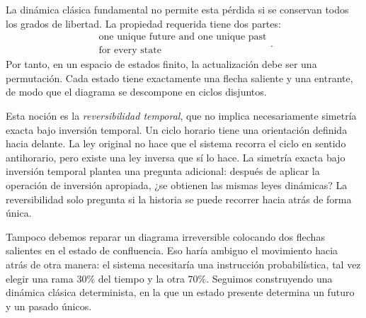 La dinámica clásica fundamental no permite esta pérdida si se conservan todos los grados de libertad. La propiedad requerida tiene dos partes:
\begin{equation}
  \boxed{\begin{gathered}
    \text{one unique future and one unique past}\\
    \text{for every state}
  \end{gathered}.}
  \label{eq:l01-reversibility}
\end{equation}
Por tanto, en un espacio de estados finito, la actualización debe ser una permutación. Cada estado tiene exactamente una flecha saliente y una entrante, de modo que el diagrama se descompone en ciclos disjuntos.

\begin{classroomqa}
\end{classroomqa}

Esta noción es la \emph{reversibilidad temporal}, que no implica necesariamente simetría exacta bajo inversión temporal. Un ciclo horario tiene una orientación definida hacia delante. La ley original no hace que el sistema recorra el ciclo en sentido antihorario, pero existe una ley inversa que sí lo hace. La simetría exacta bajo inversión temporal plantea una pregunta adicional: después de aplicar la operación de inversión apropiada, ¿se obtienen las mismas leyes dinámicas? La reversibilidad solo pregunta si la historia se puede recorrer hacia atrás de forma única.

\begin{classroomqa}
\end{classroomqa}

Tampoco debemos reparar un diagrama irreversible colocando dos flechas salientes en el estado de confluencia. Eso haría ambiguo el movimiento hacia atrás de otra manera: el sistema necesitaría una instrucción probabilística, tal vez elegir una rama \(30\%\) del tiempo y la otra \(70\%\). Seguimos construyendo una dinámica clásica determinista, en la que un estado presente determina un futuro y un pasado únicos.

